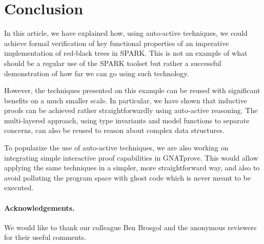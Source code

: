 \documentclass{llncs}
\begin{document}
\section{Conclusion}
In this article, we have explained how, using auto-active techniques, we could achieve formal verification of key functional
properties of an imperative implementation of red-black trees in SPARK. This is not an example of what should be a regular
use of the SPARK toolset but rather a successful demonstration of how far we can go using such technology.

However, the techniques presented on this example can be reused with significant benefits on a much smaller scale. In particular, we have shown that
inductive proofs can be achieved rather straightforwardly using auto-active reasoning. The multi-layered approach, using
type invariants and model functions to separate concerns, can also be reused to reason about complex data structures.

To popularize the use of auto-active techniques, we are also working on integrating simple interactive proof capabilities
in GNATprove. This would allow applying the same techniques in a simpler, more straightforward way, and also to avoid
polluting the program space with ghost code which is never meant to be executed.

\paragraph*{Acknowledgements.}
We would like to thank our colleague Ben Brosgol and the anonymous reviewers for their useful comments.




\end{document}
